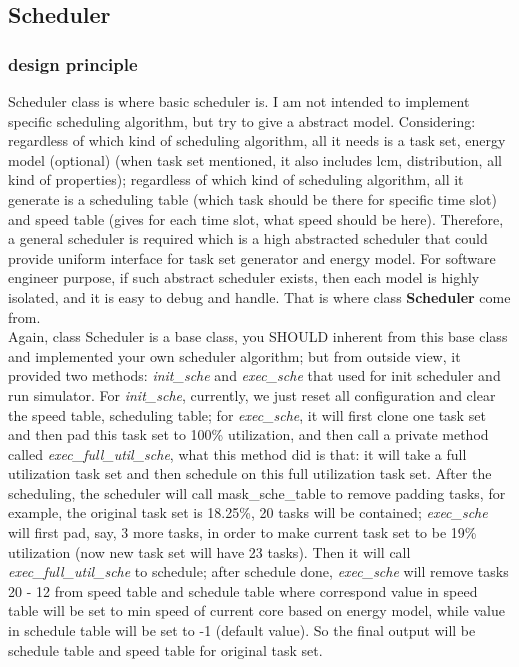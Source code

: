 \documentclass[11pt, oneside]{article}
\begin{document}
\subsection{Scheduler}
\subsubsection{design principle}
Scheduler class is where basic scheduler is. I am not intended to implement specific scheduling algorithm, but try to give a abstract model. Considering: regardless of which kind of scheduling algorithm, all it needs is a task set, energy model (optional) (when task set mentioned, it also includes lcm, distribution, all kind of properties); regardless of which kind of scheduling algorithm, all it generate is a scheduling table (which task should be there for specific time slot) and speed table (gives for each time slot, what speed should be here). Therefore, a general scheduler is required which is a high abstracted scheduler that could provide uniform interface for task set generator and energy model. For software engineer purpose, if such abstract scheduler exists, then each model is highly isolated, and it is easy to debug and handle. That is where class \textbf{Scheduler} come from. \\

Again, class Scheduler is a base class, you SHOULD inherent from this base class and implemented your own scheduler algorithm; but from outside view, it provided two methods: \textit{init\_sche} and \textit{exec\_sche} that used for init scheduler and run simulator. For \textit{init\_sche}, currently, we just reset all configuration and clear the speed table, scheduling table; for \textit{exec\_sche}, it will first clone one task set and then pad this task set to 100\% utilization, and then call a private method called \textit{exec\_full\_util\_sche}, what this method did is that: it will take a full utilization task set and then schedule on this full utilization task set. After the scheduling, the scheduler will call mask\_sche\_table to remove padding tasks, for example, the original task set is 18.25\%, 20 tasks will be contained; \textit{exec\_sche} will first pad, say, 3 more tasks, in order to make current task set to be 19\% utilization (now new task set will have 23 tasks). Then it will call \textit{exec\_full\_util\_sche} to schedule; after schedule done, \textit{exec\_sche} will remove tasks 20 - 12 from speed table and schedule table where correspond value in speed table will be set to min speed of current core based on energy model, while value in schedule table will be set to -1 (default value). So the final output will be schedule table and speed table for original task set. \\
\end{document}
